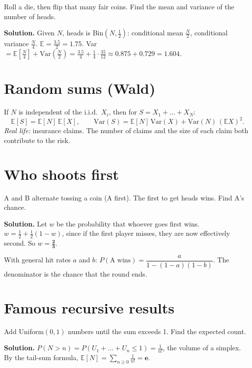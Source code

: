 \documentclass[11pt,a4paper,openany]{report}
\newcommand{\E}{\mathbb{E}}
\begin{document}
\begin{example}
Roll a die, then flip that many fair coins. Find the mean and variance of the number of heads.

\textbf{Solution.} Given $N$, heads is Bin$(N,\frac12)$: conditional mean $\frac N2$, conditional variance $\frac N4$.
$\E=\frac{3.5}2=\mathbf{1.75}$. Var $=\E\left[\frac N4\right]+\text{Var}\left(\frac N2\right)=\frac{3.5}4+\frac14\cdot\frac{35}{12}\approx0.875+0.729=\mathbf{1.604}$.
\end{example}

\section{Random sums (Wald)}
If $N$ is independent of the i.i.d.\ $X_i$, then for $S=X_1+\dots+X_N$:
\[\E[S]=\E[N]\,\E[X],\qquad\text{Var}(S)=\E[N]\,\text{Var}(X)+\text{Var}(N)\,(\E X)^2.\]
\textit{Real life:} insurance claims. The number of claims and the size of each claim both contribute to the risk.

\section{Who shoots first}
\begin{example}
A and B alternate tossing a coin (A first). The first to get heads wins. Find A's chance.

\textbf{Solution.} Let $w$ be the probability that whoever goes first wins. $w=\frac12+\frac12(1-w)$, since if the first player misses, they are now effectively second. So $w=\mathbf{\frac23}$.

With general hit rates $a$ and $b$: $P(\text{A wins})=\dfrac{a}{1-(1-a)(1-b)}$. The denominator is the chance that the round ends.
\end{example}

\section{Famous recursive results}
\begin{example}
Add Uniform$(0,1)$ numbers until the sum exceeds 1. Find the expected count.

\textbf{Solution.} $P(N>n)=P(U_1+\dots+U_n\le1)=\frac1{n!}$, the volume of a simplex. By the tail-sum formula, $\E[N]=\sum_{n\ge0}\frac1{n!}=\mathbf{e}$.
\end{example}
\end{document}
